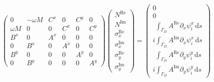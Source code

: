 \documentclass[11pt,a4paper]{article}
\begin{document}
\begin{equation}
\begin{pmatrix}
0 & -\omega M & C^x & 0 & C^y & 0\\
\omega M & 0 & 0 & C^x & 0 & C^y\\
B^x & 0 & A^x & 0 & 0 & 0\\
0 & B^x & 0 & A^x & 0 & 0\\
B^y & 0 & 0 & 0 & A^y & 0\\
0 & B^y & 0 & 0 & 0 & A^y
\end{pmatrix}
\begin{pmatrix}
N^\textrm{Re}\\
N^\textrm{Im}\\
\sigma_x^\textrm{Re}\\
\sigma_x^\textrm{Im}\\
\sigma_y^\textrm{Re}\\
\sigma_y^\textrm{Im}
\end{pmatrix}
=
\begin{pmatrix}
0\\
0\\
\phantom{i}\int_{\Gamma_D}A^\textrm{Re}\partial_x\psi^x_i\,\mathrm{d}s\\
i\int_{\Gamma_D}A^\textrm{Im}\partial_x\psi^x_i\,\mathrm{d}s\\
\phantom{i}\int_{\Gamma_D}A^\textrm{Re}\partial_y\psi^y_i\,\mathrm{d}s\\
i\int_{\Gamma_D}A^\textrm{Im}\partial_y\psi^y_i\,\mathrm{d}s
\end{pmatrix}
\end{equation}
\end{document}

